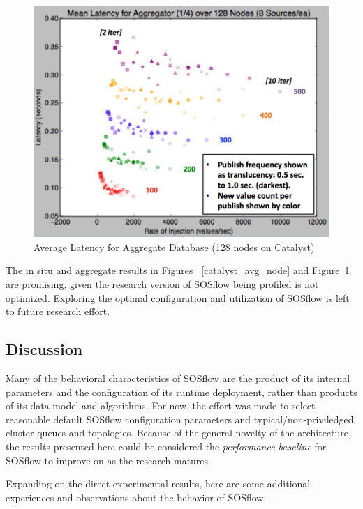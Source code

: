 \begin{figure}[h]
\centering
\includegraphics[width=\columnwidth]{images/avg_128.png}
\caption{Average Latency for Aggregate Database (128 nodes on Catalyst)}
\label{catalyst_avg_128}
\end{figure}

%
The in situ and aggregate results in Figures ~\ref{catalyst_avg_node}
and Figure~\ref{catalyst_avg_128} are promising, given the research
version of SOSflow being profiled is not optimized.
%
Exploring the optimal configuration and utilization of SOSflow is left
to future research effort.
%
\subsection{Discussion}
%
Many of the behavioral characteristics of SOSflow are the product of
its internal parameters and the configuration of its runtime
deployment, rather than products of its data model and algorithms.
%
For now, the effort was made to select reasonable default SOSflow
configuration parameters and typical/non-priviledged cluster queues
and topologies.
%
Because of the general novelty of the architecture, the results
presented here could be considered the \textit{performance baseline}
for SOSflow to improve on as the research matures.
%
\par
%
Expanding on the direct experimental results, here are some additional
experiences and observations about the behavior of SOSflow: ---
%
